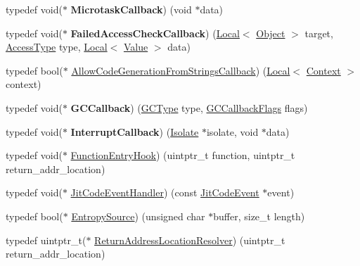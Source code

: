 \begin{DoxyCompactItemize}
\item 
typedef void($\ast$ {\bfseries Microtask\+Callback}) (void $\ast$data)\hypertarget{namespacev8_a64445c32058729cdc44d56ff13458bed}{}\label{namespacev8_a64445c32058729cdc44d56ff13458bed}

\item 
typedef void($\ast$ {\bfseries Failed\+Access\+Check\+Callback}) (\hyperlink{classv8_1_1Local}{Local}$<$ \hyperlink{classv8_1_1Object}{Object} $>$ target, \hyperlink{namespacev8_add8bef6469c5b94706584124e610046c}{Access\+Type} type, \hyperlink{classv8_1_1Local}{Local}$<$ \hyperlink{classv8_1_1Value}{Value} $>$ data)\hypertarget{namespacev8_a1352a0d6e487b7092ea79e2d3d4ecd12}{}\label{namespacev8_a1352a0d6e487b7092ea79e2d3d4ecd12}

\item 
typedef bool($\ast$ \hyperlink{namespacev8_a521d909ec201742a1cb35d50a8e2a3c2}{Allow\+Code\+Generation\+From\+Strings\+Callback}) (\hyperlink{classv8_1_1Local}{Local}$<$ \hyperlink{classv8_1_1Context}{Context} $>$ context)
\item 
typedef void($\ast$ {\bfseries G\+C\+Callback}) (\hyperlink{namespacev8_ac109d6f27e0c0f9ef4e98bcf7a806cf2}{G\+C\+Type} type, \hyperlink{namespacev8_a247c37a849f4d6c293b9b16e94e1944b}{G\+C\+Callback\+Flags} flags)\hypertarget{namespacev8_aa789d9f0935eb32c27ec05e0f818a6c4}{}\label{namespacev8_aa789d9f0935eb32c27ec05e0f818a6c4}

\item 
typedef void($\ast$ {\bfseries Interrupt\+Callback}) (\hyperlink{classv8_1_1Isolate}{Isolate} $\ast$isolate, void $\ast$data)\hypertarget{namespacev8_af07fcf2ef61237b7ba67242700b6a875}{}\label{namespacev8_af07fcf2ef61237b7ba67242700b6a875}

\item 
typedef void($\ast$ \hyperlink{namespacev8_aaf07fb6bb13f295da3c6568938b7dec5}{Function\+Entry\+Hook}) (uintptr\+\_\+t function, uintptr\+\_\+t return\+\_\+addr\+\_\+location)
\item 
typedef void($\ast$ \hyperlink{namespacev8_a39243bc91e63d64d111452fdb98c4733}{Jit\+Code\+Event\+Handler}) (const \hyperlink{structv8_1_1JitCodeEvent}{Jit\+Code\+Event} $\ast$event)
\item 
typedef bool($\ast$ \hyperlink{namespacev8_ab699f4bbbb56350e6e915682e420fcdc}{Entropy\+Source}) (unsigned char $\ast$buffer, size\+\_\+t length)
\item 
typedef uintptr\+\_\+t($\ast$ \hyperlink{namespacev8_a8ce54c75241be41ff6a25e9944eefd2a}{Return\+Address\+Location\+Resolver}) (uintptr\+\_\+t return\+\_\+addr\+\_\+location)
\end{DoxyCompactItemize}
